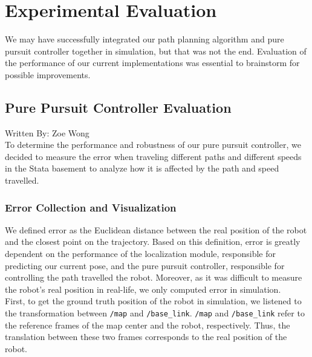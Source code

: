 \documentclass{article}
\begin{document}
\section{Experimental Evaluation}

We may have successfully integrated our path planning algorithm and pure pursuit controller together in simulation, but that was not the end. Evaluation of the performance of our current implementations was essential to brainstorm for possible improvements.

\subsection{Pure Pursuit Controller Evaluation}
Written By: Zoe Wong\\

To determine the performance and robustness of our pure pursuit controller, we decided to measure the error when traveling different paths and different speeds in the Stata basement to analyze how it is affected by the path and speed travelled. 

\subsubsection{Error Collection and Visualization}

We defined error as the Euclidean distance between the real position of the robot and the closest point on the trajectory. Based on this definition, error is greatly dependent on the performance of the localization module, responsible for predicting our current pose, and the pure pursuit controller, responsible for controlling the path travelled the robot. Moreover, as it was difficult to measure the robot’s real position in real-life, we only computed error in simulation.\\

First, to get the ground truth position of the robot in simulation, we listened to the transformation between \texttt{/map} and \texttt{/base\_link}. \texttt{/map} and \texttt{/base\_link} refer to the reference frames of the map center and the robot, respectively. Thus, the translation between these two frames corresponds to the real position of the robot. \\
\end{document}
